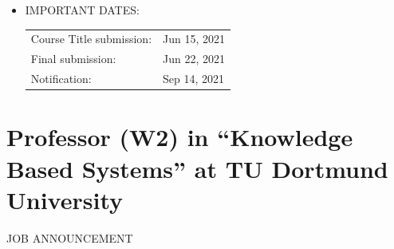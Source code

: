 \documentclass[prodmode,acmtecs]{acmsmall} %
\begin{document}
\begin{itemize}
\item  IMPORTANT DATES: 
 
\begin{tabulary}{\linewidth}{LL}Course Title submission:  & Jun 15, 2021 \\
Final submission:  & Jun 22, 2021 \\
Notification:  & Sep 14, 2021 \\
\end{tabulary}
 
\end{itemize}\section{Professor (W2) in “Knowledge Based Systems” at TU Dortmund University}\label{ProfessorW2inKnowledgeBasedSystemsatTUDortmundUniversity}JOB ANNOUNCEMENT 
\end{document}
